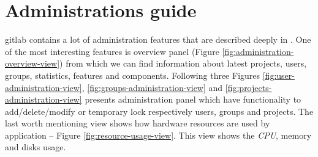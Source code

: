 \section{Administrations guide} \label{s:platform-user-guide:administrations}
	\gls{gitlab} contains a lot of administration features that are described deeply in \cite{bib:gitlabce-documentation-overview}. One of the most interesting features is overview panel (Figure \ref{fig:administration-overview-view}) from which we can find information about latest projects, users, groups, statistics, features and components. Following three Figures \ref{fig:user-administration-view}, \ref{fig:groups-administration-view} and \ref{fig:projects-administration-view} presents administration panel which have functionality to add/delete/modify or temporary lock respectively users, groups and projects. The last worth mentioning view shows how hardware resources are used by application -- Figure \ref{fig:resource-usage-view}. This view shows the \emph{CPU}, memory and disks usage.